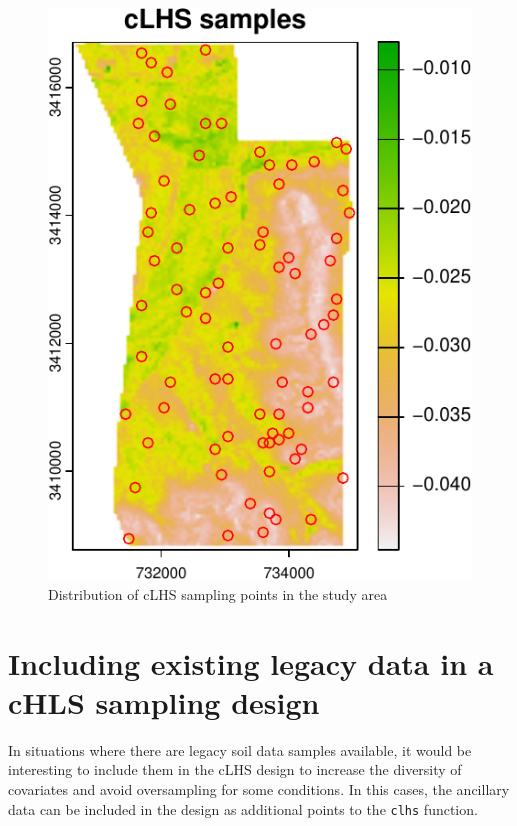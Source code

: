 \documentclass[
  10pt,
  b5paper,
  oneside]{book}
\begin{document}
\begin{figure}
\centering
\includegraphics{Technical-Manual-Soil-Sampling-Design_files/figure-latex/fig-17-1.pdf}
\caption{\label{fig:fig-17}Distribution of cLHS sampling points in the study area}
\end{figure}

\hypertarget{including-existing-legacy-data-in-a-chls-sampling-design}{%
\section{Including existing legacy data in a cHLS sampling design}\label{including-existing-legacy-data-in-a-chls-sampling-design}}

In situations where there are legacy soil data samples available, it would be interesting to include them in the cLHS design to increase the diversity of covariates and avoid oversampling for some conditions. In this cases, the ancillary data can be included in the design as additional points to the \texttt{\textquotesingle{}clhs\textquotesingle{}} function.
\end{document}
